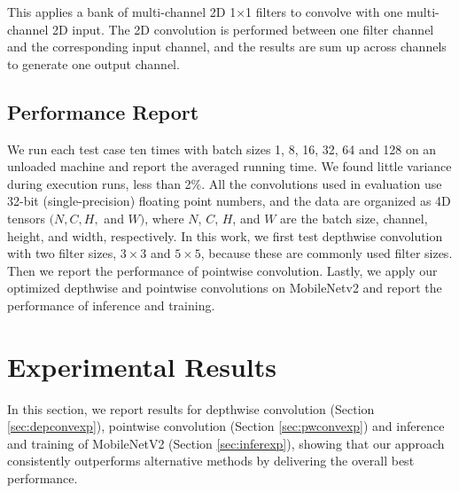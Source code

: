  This applies a bank of multi-channel 2D 1$\times$1 filters to convolve with one multi-channel 2D input. 
The 2D convolution is performed between one filter channel and the corresponding input channel, and the results are sum up across channels to generate one output channel.


\subsection{Performance Report}
We run each test case ten times with batch sizes 1, 8, 16, 32, 64 and 128 on an unloaded machine and report the averaged running time. 
We found little variance during execution runs, less than 2\%.  
All the convolutions used in evaluation use 32-bit (single-precision) floating point numbers, and the data are organized as 4D tensors $(N,C,H,$ and $W)$, where $N$, $C$, $H$, and $W$ are the batch size, channel, height, and width, respectively. 
In this work, we first test depthwise convolution with two filter sizes, $3 \times 3$ and $5 \times 5$, because these are commonly used filter sizes. 
Then we report the performance of pointwise convolution. 
Lastly, we apply our optimized depthwise and pointwise convolutions on MobileNetv2 and report the performance of inference and training.
%

\section{Experimental Results}
\label{exp} In this section, we report results for depthwise convolution (Section \ref{sec:depconvexp}), pointwise convolution (Section \ref{sec:pwconvexp}) and inference and training of MobileNetV2 (Section \ref{sec:inferexp}), showing that our approach consistently outperforms alternative methods by delivering the overall best performance.



